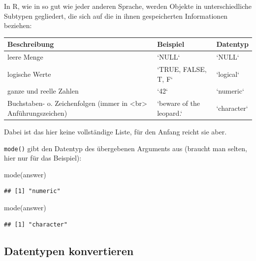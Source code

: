\documentclass[
]{book}
\newenvironment{Shaded}{\begin{snugshade}}{\end{snugshade}}
\newcommand{\FunctionTok}[1]{\textcolor[rgb]{0.00,0.00,0.00}{#1}}
\newcommand{\NormalTok}[1]{#1}
\newcommand{\StringTok}[1]{\textcolor[rgb]{0.31,0.60,0.02}{#1}}
\begin{document}
\small

In R, wie in so gut wie jeder anderen Sprache, werden Objekte in unterschiedliche Subtypen gegliedert, die sich auf die in ihnen gespeicherten Informationen beziehen:

\begin{tabular}[t]{l|l|l}
\hline
Beschreibung & Beispiel & Datentyp\\
\hline
leere Menge & `NULL` & `NULL`\\
\hline
logische Werte & `TRUE, FALSE, T,  F` & `logical`\\
\hline
ganze und reelle Zahlen & `42` & `numeric`\\
\hline
Buchstaben- o. Zeichenfolgen (immer in <br> Anführungszeichen) & `beware of the leopard.` & `character`\\
\hline
\end{tabular}

Dabei ist das hier keine vollständige Liste, für den Anfang reicht sie aber.

\texttt{mode()} gibt den Datentyp des übergebenen Arguments aus (braucht man selten, hier nur für das Beispiel):

\begin{Shaded}
\begin{Highlighting}[]
\FunctionTok{mode}\NormalTok{(answer)}
\end{Highlighting}
\end{Shaded}

\begin{verbatim}
## [1] "numeric"
\end{verbatim}

\begin{Shaded}
\begin{Highlighting}[]
\FunctionTok{mode}\NormalTok{(}\StringTok{\textquotesingle{}answer\textquotesingle{}}\NormalTok{)}
\end{Highlighting}
\end{Shaded}

\begin{verbatim}
## [1] "character"
\end{verbatim}

\hypertarget{datentypen-konvertieren}{%
\subsection*{Datentypen konvertieren}\label{datentypen-konvertieren}}

\scriptsize
\end{document}
